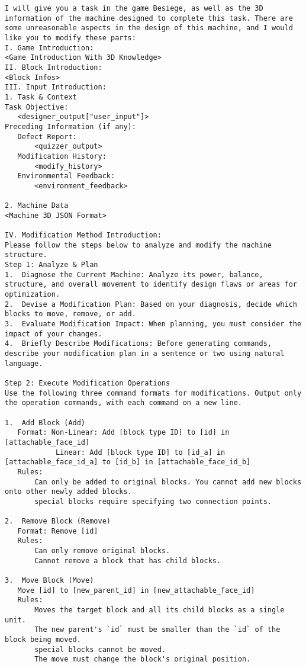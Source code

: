 \begin{lstlisting}
I will give you a task in the game Besiege, as well as the 3D information of the machine designed to complete this task. There are some unreasonable aspects in the design of this machine, and I would like you to modify these parts:
I. Game Introduction:
<Game Introduction With 3D Knowledge>
II. Block Introduction:
<Block Infos>
III. Input Introduction:
1. Task & Context
Task Objective:
   <designer_output["user_input"]>
Preceding Information (if any):
   Defect Report:
       <quizzer_output>
   Modification History:
       <modify_history>
   Environmental Feedback:
       <environment_feedback>
       
2. Machine Data
<Machine 3D JSON Format>

IV. Modification Method Introduction:
Please follow the steps below to analyze and modify the machine structure.
Step 1: Analyze & Plan
1.  Diagnose the Current Machine: Analyze its power, balance, structure, and overall movement to identify design flaws or areas for optimization.
2.  Devise a Modification Plan: Based on your diagnosis, decide which blocks to move, remove, or add.
3.  Evaluate Modification Impact: When planning, you must consider the impact of your changes.
4.  Briefly Describe Modifications: Before generating commands, describe your modification plan in a sentence or two using natural language.

Step 2: Execute Modification Operations
Use the following three command formats for modifications. Output only the operation commands, with each command on a new line.

1.  Add Block (Add)
   Format: Non-Linear: Add [block type ID] to [id] in [attachable_face_id]
            Linear: Add [block type ID] to [id_a] in [attachable_face_id_a] to [id_b] in [attachable_face_id_b]
   Rules:
       Can only be added to original blocks. You cannot add new blocks onto other newly added blocks.
       special blocks require specifying two connection points.

2.  Remove Block (Remove)
   Format: Remove [id]
   Rules:
       Can only remove original blocks.
       Cannot remove a block that has child blocks.

3.  Move Block (Move)
   Move [id] to [new_parent_id] in [new_attachable_face_id]
   Rules:
       Moves the target block and all its child blocks as a single unit.
       The new parent's `id` must be smaller than the `id` of the block being moved.
       special blocks cannot be moved.
       The move must change the block's original position.
       

\end{lstlisting}
